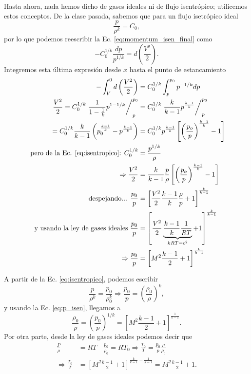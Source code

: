 Hasta ahora, nada hemos dicho de gases ideales ni de flujo isentrópico; utilicemos estos conceptos.
De la clase pasada, sabemos que para un flujo isetrópico ideal
%
\begin{equation}\label{eq:isentropico}
\frac{p}{\rho^k} = C_0,
\end{equation}
%
por lo que podemos reescribir la Ec. \eqref{eq:momentum_isen_final} como
%
\begin{equation}
-C_0^{1/k}\frac{dp}{p^{1/k}} = d\left(\frac{V^2}{2}\right).
\end{equation}
%
Integremos esta última expresión desde $x$ hasta el punto de estancamiento
%
\begin{align}\label{eq:p_isen}
-\int_V^0d\left(\frac{V^2}{2}\right) &= C_0^{1/k}\int_p^{p_0}p^{-1/k}dp\nonumber\\
\frac{V^2}{2} = C_0^{1/k} \left.\frac{1}{1-\frac{1}{k}}p^{1-1/k}\right/_p^{p_0}&= C_0^{1/k}\left.\frac{k}{k-1}p^{\frac{k-1}{k}}\right/_p^{p_0}\nonumber\\
=C_0^{1/k}\frac{k}{k-1}\left(p_0^{\frac{k-1}{k}}-p^{\frac{k-1}{k}}\right) &= C_0^{1/k}p^{\frac{k-1}{k}}\left[\left(\frac{p_o}{p}\right)^{\frac{k-1}{k}}-1\right]\nonumber\\
\text{ pero de la Ec. \eqref{eq:isentropico}:   } C_0^{1/k} &= \frac{p^{1/k}}{\rho}\nonumber\\
\Rightarrow\frac{V^2}{2}&=\frac{k}{k-1}\frac{p}{\rho}\left[\left(\frac{p_o}{p}\right)^{\frac{k-1}{k}}-1\right]\nonumber\\
\text{despejando...   } \frac{p_0}{p} &= \left[\frac{V^2}{2}\frac{k-1}{k}\frac{\rho}{p}+1\right]^\frac{k}{k-1}\nonumber\\
\text{y usando la ley de gases ideales   } \frac{p_0}{p} &= \left[\frac{V^2}{2}\underbrace{\frac{k-1}{k}\frac{1}{RT}}_{kRT=c^2}+1\right]^\frac{k}{k-1}\nonumber\\
\Rightarrow \frac{p_0}{p} &= \left[M^2\frac{k-1}{2}+1\right]^\frac{k}{k-1}
\end{align}

A partir de la Ec. \eqref{eq:isentropico}, podemos escribir
%
\begin{equation}
\frac{p}{\rho^k} = \frac{p_0}{\rho_0^k} \Rightarrow \frac{p_0}{p} = \left(\frac{\rho_0}{\rho}\right)^k,
\end{equation}
%
y usando la Ec. \eqref{eq:p_isen}, llegamos a
%
\begin{equation}\label{eq:rho_isen}
\frac{\rho_0}{\rho} = \left(\frac{p_0}{p}\right)^{1/k} = \left[M^2\frac{k-1}{2}+1\right]^\frac{1}{k-1}.
\end{equation}
%
Por otra parte, desde la ley de gases ideales podemos decir que
%
\begin{align}\label{eq:T_isen}
\frac{P}{\rho}&=RT \quad \frac{p_0}{\rho_0} = RT_0\Rightarrow \frac{T_0}{T} = \frac{p_0}{p}\frac{\rho}{\rho_0}\nonumber\\
\Rightarrow \frac{T_0}{T} &= \left[M^2\frac{k-1}{2}+1\right]^{\frac{k}{k-1}-\frac{1}{k-1}} = M^2\frac{k-1}{2}+1.
\end{align}

